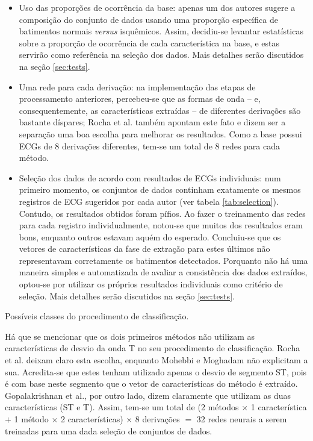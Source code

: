\begin{itemize}
    \item Uso das proporções de ocorrência da base: apenas um dos autores sugere a composição do conjunto de dados usando uma proporção específica de batimentos normais \emph{versus} isquêmicos. Assim, decidiu-se levantar estatísticas sobre a proporção de ocorrência de cada característica na base, e estas servirão como referência na seleção dos dados. Mais detalhes serão discutidos na seção \ref{sec:tests}.
    \item Uma rede para cada derivação: na implementação das etapas de processamento anteriores, percebeu-se que as formas de onda -- e, consequentemente, as características extraídas -- de diferentes derivações são bastante díspares; Rocha et al. também apontam este fato e dizem ser a separação uma boa escolha para melhorar os resultados. Como a base possui ECGs de 8 derivações diferentes, tem-se um total de 8 redes para cada método.
    \item Seleção dos dados de acordo com resultados de ECGs individuais: num primeiro momento, os conjuntos de dados continham exatamente os mesmos registros de ECG sugeridos por cada autor (ver tabela \ref{tab:selection}). Contudo, os resultados obtidos foram pífios. Ao fazer o treinamento das redes para cada registro individualmente, notou-se que muitos dos resultados eram bons, enquanto outros estavam aquém do esperado. Concluiu-se que os vetores de características da fase de extração para estes últimos não representavam corretamente os batimentos detectados. Porquanto não há uma maneira simples e automatizada de avaliar a consistência dos dados extraídos, optou-se por utilizar os próprios resultados individuais como critério de seleção. Mais detalhes serão discutidos na seção \ref{sec:tests}.
\end{itemize}

\begin{table}[ht!]
    \centering
    
    \caption[Possíveis classes do procedimento de classificação]{Possíveis classes do procedimento de classificação.}
    \label{tab:nnclasses}
\end{table}

Há que se mencionar que os dois primeiros métodos não utilizam as características de desvio da onda T no seu procedimento de classificação. Rocha et al. deixam claro esta escolha, enquanto Mohebbi e Moghadam não explicitam a sua. Acredita-se que estes tenham utilizado apenas o desvio de segmento ST, pois é com base neste segmento que o vetor de características do método é extraído. Gopalakrishnan et al., por outro lado, dizem claramente que utilizam as duas características (ST e T). Assim, tem-se um total de (2 métodos $\times$ 1 característica $+$ 1 método $\times$ 2 características) $\times$ 8 derivações $=$ 32 redes neurais a serem treinadas para uma dada seleção de conjuntos de dados.

